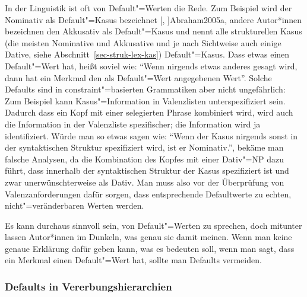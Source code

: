 In der Linguistik ist oft von Default"=Werten die Rede. 
Zum Beispiel wird der Nominativ als Default"=Kasus bezeichnet \parencites[]{Sternefeld95a}[]{Jacobs91a}%
[, ]{Abraham2005a}, %
andere Autor*innen bezeichnen den Akkusativ als Default"=Kasus \parencites[]{Zwicky86}[]{Hoeksema91c} und \citet[]{Wunderlich93a} nennt alle strukturellen Kasus
(\dash die meisten Nominative und Akkusative und je nach Sichtweise auch einige Dative, siehe Abschnitt~\ref{sec-struk-lex-kas}) Default"=Kasus.
%
Dass etwas einen Default"=Wert hat, heißt soviel wie: "`Wenn nirgends etwas anderes gesagt
wird, dann hat ein Merkmal den als Default"=Wert angegebenen Wert"'. Solche Defaults sind
in constraint"=basierten Grammatiken aber nicht ungefährlich: Zum Beispiel kann Kasus"=Information
in Valenzlisten unterspezifiziert sein. Dadurch dass ein Kopf mit einer selegierten Phrase
kombiniert wird, wird auch die Information in der Valenzliste spezifischer; die
Information wird ja identifiziert. Würde man so etwas sagen wie: "`Wenn der Kasus nirgends
sonst in der syntaktischen Struktur spezifiziert wird, ist er Nominativ."', bekäme man falsche
Analysen, da die Kombination des Kopfes mit einer Dativ"=NP dazu führt, dass innerhalb der
syntaktischen Struktur der Kasus spezifiziert ist und zwar unerwünschterweise als Dativ.
Man muss also vor der Überprüfung von Valenzanforderungen dafür sorgen, dass entsprechende
Defaultwerte zu echten, nicht"=veränderbaren Werten werden.

Es kann durchaus sinnvoll sein, von Default"=Werten zu sprechen, doch mitunter lassen Autor*innen im Dunkeln,
was genau sie damit meinen. Wenn man keine genaue Erklärung dafür geben kann, 
was es bedeuten soll, wenn man sagt, dass ein Merkmal einen Default"=Wert hat,
sollte man Defaults vermeiden.

\subsubsection{Defaults in Vererbungshierarchien}

